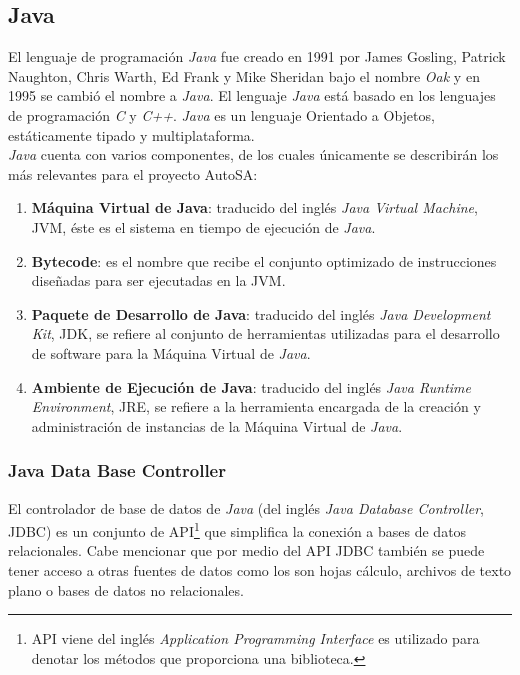 \subsection{Java}\label{sec:java}

El lenguaje de programación \textit{Java} fue creado en 1991 por James Gosling, Patrick Naughton, Chris Warth, Ed Frank y Mike Sheridan bajo el nombre \textit{Oak} y en 1995 se cambió el nombre a \textit{Java}. El lenguaje \textit{Java} está basado en los lenguajes de programación \textit{C} y \textit{C++}. \textit{Java} es un lenguaje Orientado a Objetos, estáticamente tipado y multiplataforma\cite{JavaCompleteReference, WellGroundedJavaDeveloper}.\\
\textit{Java} cuenta con varios componentes, de los cuales únicamente se describirán los más relevantes para el proyecto AutoSA\cite{JavaCompleteReference, WellGroundedJavaDeveloper}:
\begin{enumerate}
	\item \textbf{Máquina Virtual de Java}: traducido del inglés \textit{Java Virtual Machine}, JVM, éste es el sistema en tiempo de ejecución de \textit{Java}.
	\item \textbf{Bytecode}: es el nombre que recibe el conjunto optimizado de instrucciones diseñadas para ser ejecutadas en la JVM.
	\item \textbf{Paquete de Desarrollo de Java}: traducido del inglés \textit{Java Development Kit}, JDK, se refiere al conjunto de herramientas utilizadas para el desarrollo de software para la Máquina Virtual de \textit{Java}.
	\item \textbf{Ambiente de Ejecución de Java}: traducido del inglés \textit{Java Runtime Environment}, JRE, se refiere a la herramienta encargada de la creación y administración de instancias de la Máquina Virtual de \textit{Java}.
\end{enumerate}

\subsubsection{Java Data Base Controller}\label{sec:jdbc}
El controlador de base de datos de \textit{Java} (del inglés \textit{Java Database Controller}, JDBC) es un conjunto de API\footnote{API viene del inglés \textit{Application Programming Interface} es utilizado para denotar los métodos que proporciona una biblioteca.} que simplifica la conexión a bases de datos relacionales. Cabe mencionar que por medio del API JDBC también se puede tener acceso a otras fuentes de datos como los son hojas cálculo, archivos de texto plano o bases de datos no relacionales\cite{JDBCRecipes, BeginingJava8APIs}.


